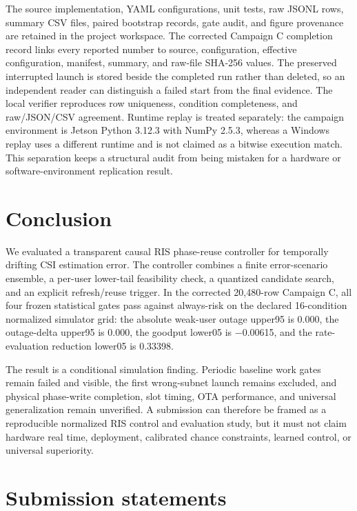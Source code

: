 \documentclass[10pt,twocolumn]{article}
\begin{document}
The source implementation, YAML configurations, unit tests, raw JSONL
rows, summary CSV files, paired bootstrap records, gate audit, and
figure provenance are retained in the project workspace. The corrected
Campaign C completion record links every reported number to source,
configuration, effective configuration, manifest, summary, and raw-file
SHA-256 values. The preserved interrupted launch is stored beside the
completed run rather than deleted, so an independent reader can
distinguish a failed start from the final evidence. The local verifier
reproduces row uniqueness, condition completeness, and raw/JSON/CSV
agreement. Runtime replay is treated separately: the campaign
environment is Jetson Python 3.12.3 with NumPy 2.5.3, whereas a Windows
replay uses a different runtime and is not claimed as a bitwise
execution match. This separation keeps a structural audit from being
mistaken for a hardware or software-environment replication result.

\section{Conclusion}\label{conclusion}

We evaluated a transparent causal RIS phase-reuse controller for
temporally drifting CSI estimation error. The controller combines a
finite error-scenario ensemble, a per-user lower-tail feasibility check,
a quantized candidate search, and an explicit refresh/reuse trigger. In
the corrected 20,480-row Campaign C, all four frozen statistical gates
pass against always-risk on the declared 16-condition normalized
simulator grid: the absolute weak-user outage upper95 is 0.000, the
outage-delta upper95 is 0.000, the goodput lower05 is −0.00615, and the
rate-evaluation reduction lower05 is 0.33398.

The result is a conditional simulation finding. Periodic baseline work
gates remain failed and visible, the first wrong-subnet launch remains
excluded, and physical phase-write completion, slot timing, OTA
performance, and universal generalization remain unverified. A
submission can therefore be framed as a reproducible normalized RIS
control and evaluation study, but it must not claim hardware real time,
deployment, calibrated chance constraints, learned control, or universal
superiority.

\section*{Submission statements}\label{submission-statements}
\end{document}
